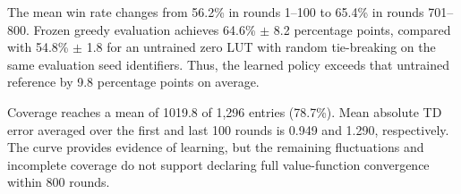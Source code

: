 The mean win rate changes from 56.2\% in rounds 1--100 to 65.4\% in rounds 701--800. Frozen greedy evaluation achieves 64.6\% $\pm$ 8.2 percentage points, compared with 54.8\% $\pm$ 1.8 for an untrained zero LUT with random tie-breaking on the same evaluation seed identifiers. Thus, the learned policy exceeds that untrained reference by 9.8 percentage points on average.

Coverage reaches a mean of 1019.8 of 1,296 entries (78.7\%). Mean absolute TD error averaged over the first and last 100 rounds is 0.949 and 1.290, respectively. The curve provides evidence of learning, but the remaining fluctuations and incomplete coverage do not support declaring full value-function convergence within 800 rounds.\par
